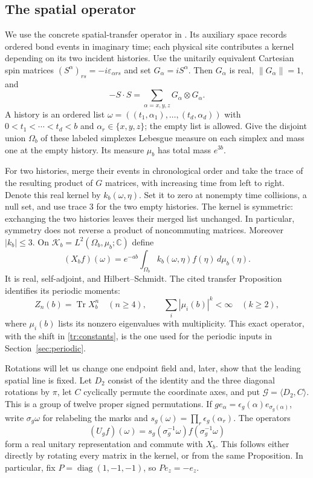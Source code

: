 \documentclass[11pt]{article}
\theoremstyle{remark}
\numberwithin{equation}{section}
\begin{document}
\subsection{The spatial operator}
We use the concrete spatial-transfer operator in
\cite[Proposition 3.1]{periodic}. Its auxiliary space records ordered
bond events in imaginary time; each physical site contributes a kernel
depending on its two incident histories. Use the unitarily equivalent
Cartesian
spin matrices $(S^\alpha)_{rs}=-i\varepsilon_{\alpha rs}$ and set
$G_\alpha=iS^\alpha$. Then $G_\alpha$ is real,
$\lVert G_\alpha\rVert=1$, and
\[
 -S\cdot S=\sum_{\alpha=x,y,z}G_\alpha\otimes G_\alpha.
\]
A history is an ordered list
$\omega=((t_1,\alpha_1),\ldots,(t_d,\alpha_d))$ with
$0<t_1<\cdots<t_d<b$ and $\alpha_r\in\{x,y,z\}$; the empty list
is allowed. Give the disjoint union $\Omega_b$ of these labeled
simplexes Lebesgue measure on each simplex and mass one at the empty
history. Its measure $\mu_b$ has total mass $e^{3b}$.

For two histories, merge their events in chronological order and take
the trace of the resulting product of $G$ matrices, with increasing
time from left to right. Denote this real kernel by $k_b(\omega,\eta)$.
Set it to zero at nonempty time
collisions, a null set, and use trace $3$ for the two empty histories.
The kernel is symmetric: exchanging the two histories leaves their
merged list unchanged. In particular, symmetry does not reverse a
product of noncommuting matrices. Moreover $|k_b|\le3$.
On $\mathcal K_b=L^2(\Omega_b,\mu_b;\mathbb C)$ define
\begin{equation}\label{tr:operator}
 (X_bf)(\omega)=e^{-ab}\int_{\Omega_b}k_b(\omega,\eta)
                                      f(\eta)\,d\mu_b(\eta).
\end{equation}
It is real, self-adjoint, and Hilbert--Schmidt. The cited transfer
Proposition identifies its periodic moments:
\begin{equation}\label{tr:periodic}
 Z_n(b)=\operatorname{Tr} X_b^n\quad(n\ge4),\qquad
 \sum_i|\mu_i(b)|^k<\infty\quad(k\ge2),
\end{equation}
where $\mu_i(b)$ lists its nonzero eigenvalues with multiplicity.
This exact operator, with the shift in \eqref{tr:constants}, is the one
used for the periodic inputs in Section~\ref{sec:periodic}.

Rotations will let us change one endpoint field and, later, show that
the leading spatial line is fixed. Let $D_2$ consist of the identity
and the three diagonal rotations by
$\pi$, let $C$ cyclically permute the coordinate axes, and put
$\mathcal G=\langle D_2,C\rangle$. This is a group of twelve proper
signed permutations. If $ge_\alpha=\epsilon_g(\alpha)
e_{\sigma_g(\alpha)}$, write $\sigma_g\omega$ for relabeling the
marks and $s_g(\omega)=\prod_r\epsilon_g(\alpha_r)$. The operators
\begin{equation}\label{tr:rotations}
 (U_gf)(\omega)=s_g(\sigma_g^{-1}\omega)f(\sigma_g^{-1}\omega)
\end{equation}
form a real unitary representation and commute with $X_b$. This follows
either directly by rotating every matrix in the kernel, or from the
same Proposition. In particular, fix
$P=\operatorname{diag}(1,-1,-1)$, so $Pe_z=-e_z$.
\end{document}
